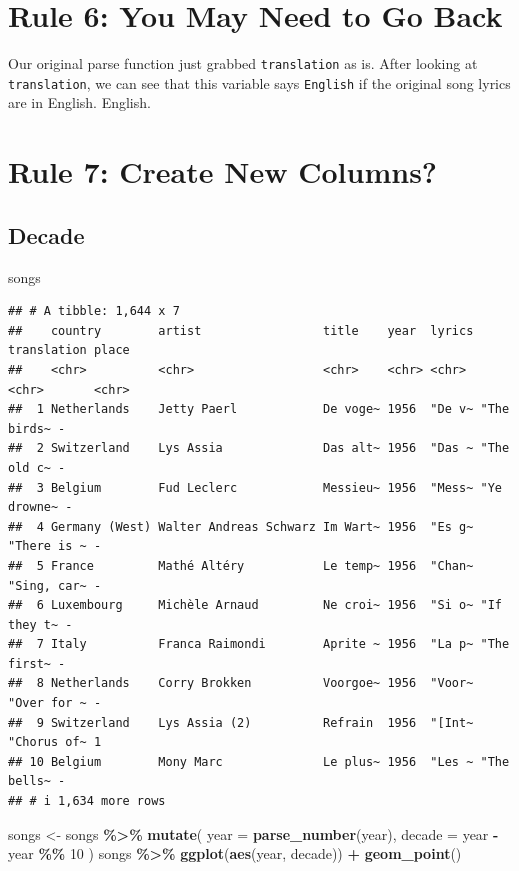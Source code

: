 \documentclass[
]{article}
\newenvironment{Shaded}{\begin{snugshade}}{\end{snugshade}}
\newcommand{\AttributeTok}[1]{\textcolor[rgb]{0.13,0.29,0.53}{#1}}
\newcommand{\DecValTok}[1]{\textcolor[rgb]{0.00,0.00,0.81}{#1}}
\newcommand{\FunctionTok}[1]{\textcolor[rgb]{0.13,0.29,0.53}{\textbf{#1}}}
\newcommand{\NormalTok}[1]{#1}
\newcommand{\OtherTok}[1]{\textcolor[rgb]{0.56,0.35,0.01}{#1}}
\newcommand{\SpecialCharTok}[1]{\textcolor[rgb]{0.81,0.36,0.00}{\textbf{#1}}}
\begin{document}
\section{Rule 6: You May Need to Go
Back}\label{rule-6-you-may-need-to-go-back}

Our original parse function just grabbed \texttt{translation} as is.
After looking at \texttt{translation}, we can see that this variable
says \texttt{English} if the original song lyrics are in English.
English.

\section{Rule 7: Create New Columns?}\label{rule-7-create-new-columns}

\subsection{Decade}\label{decade}

\begin{Shaded}
\begin{Highlighting}[]
\NormalTok{songs}
\end{Highlighting}
\end{Shaded}

\begin{verbatim}
## # A tibble: 1,644 x 7
##    country        artist                 title    year  lyrics translation place
##    <chr>          <chr>                  <chr>    <chr> <chr>  <chr>       <chr>
##  1 Netherlands    Jetty Paerl            De voge~ 1956  "De v~ "The birds~ -    
##  2 Switzerland    Lys Assia              Das alt~ 1956  "Das ~ "The old c~ -    
##  3 Belgium        Fud Leclerc            Messieu~ 1956  "Mess~ "Ye drowne~ -    
##  4 Germany (West) Walter Andreas Schwarz Im Wart~ 1956  "Es g~ "There is ~ -    
##  5 France         Mathé Altéry           Le temp~ 1956  "Chan~ "Sing, car~ -    
##  6 Luxembourg     Michèle Arnaud         Ne croi~ 1956  "Si o~ "If they t~ -    
##  7 Italy          Franca Raimondi        Aprite ~ 1956  "La p~ "The first~ -    
##  8 Netherlands    Corry Brokken          Voorgoe~ 1956  "Voor~ "Over for ~ -    
##  9 Switzerland    Lys Assia (2)          Refrain  1956  "[Int~ "Chorus of~ 1    
## 10 Belgium        Mony Marc              Le plus~ 1956  "Les ~ "The bells~ -    
## # i 1,634 more rows
\end{verbatim}

\begin{Shaded}
\begin{Highlighting}[]
\NormalTok{songs }\OtherTok{\textless{}{-}} 
\NormalTok{  songs }\SpecialCharTok{\%\textgreater{}\%} 
  \FunctionTok{mutate}\NormalTok{(}
    \AttributeTok{year =} \FunctionTok{parse\_number}\NormalTok{(year), }
    \AttributeTok{decade =}\NormalTok{ year }\SpecialCharTok{{-}}\NormalTok{ year }\SpecialCharTok{\%\%} \DecValTok{10}
\NormalTok{  )}
\NormalTok{songs }\SpecialCharTok{\%\textgreater{}\%} 
  \FunctionTok{ggplot}\NormalTok{(}\FunctionTok{aes}\NormalTok{(year, decade)) }\SpecialCharTok{+} 
  \FunctionTok{geom\_point}\NormalTok{()}
\end{Highlighting}
\end{Shaded}
\end{document}
